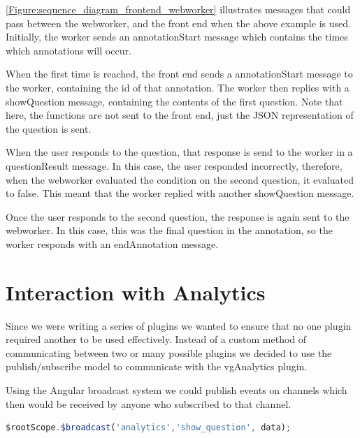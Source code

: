 \autoref{Figure:sequence_diagram_frontend_webworker} illustrates messages that could pass between the \gls{webworker}, and the front end when the above example is used. Initially, the worker sends an annotationStart message which contains the times which annotations will
occur.

When the first time is reached, the front end sends a annotationStart message to the worker, containing the id of that annotation. The worker then replies with a showQuestion message, containing the contents of the first question. Note that here, the functions are not sent to the front end, just the JSON representation of the question is sent.

When the user responds to the question, that response is send to the worker in a questionResult message. In this case, the user responded incorrectly, therefore, when the \gls{webworker} evaluated the condition on the second question, it evaluated to false. This meant that the worker replied with another showQuestion message.

Once the user responds to the second question, the response is again sent to the \gls{webworker}. In this case, this was the final question in the annotation, so the worker responds with an endAnnotation message.

\section{Interaction with Analytics}
\label{Section:vgQuestions Analytics}


Since we were writing a series of plugins we wanted to ensure that no one plugin required another to be used effectively. Instead of a custom method of communicating between two or many possible plugins we decided to use the publish/subscribe model to communicate with the vgAnalytics plugin.

Using the Angular broadcast system we could publish events on channels which then would be received by anyone who subscribed to that channel.

\begin{lstlisting}[language=javascript,caption={AngularJS demonstrating the message passing interface used in the Analytics plugin},label={code:analytics_message_passing}]
$rootScope.$broadcast('analytics','show_question', data);
\end{lstlisting}

